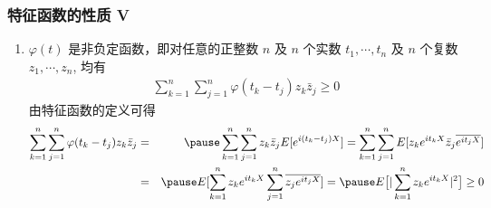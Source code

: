 \documentclass[Prob-All.tex]{subfiles}
\begin{document}
\begin{frame}
	\frametitle{特征函数的性质 V}

	\begin{enumerate}
		\item[9.] $\varphi (t)$ 是非负定函数，即对任意的正整数 $n$ 及 $n$ 个实数 $t_1,\cdots, t_n$ 及 $n$ 个复数 $z_1,\cdots, z_n$, 均有
		\begin{eqnarray*}
			\sum_{k=1}^n\sum_{j=1}^n\varphi(t_k-t_j)z_k\bar{z}_j\ge 0
		\end{eqnarray*}
		\zheng 由特征函数的定义可得
		{\small\begin{eqnarray*}
				\sum_{k=1}^n\sum_{j=1}^n\varphi(t_k-t_j)z_k\bar{z}_j&=&\pause \sum_{k=1}^n\sum_{j=1}^nz_k\bar{z}_jE[e^{i(t_k-t_j)X}]=\sum_{k=1}^n\sum_{j=1}^nE[z_ke^{it_kX}\bar{z}_j\overline{e^{it_jX}}]\\
				&=&\pause E[\sum_{k=1}^nz_ke^{it_kX}\sum_{j=1}^n\overline{z_je^{it_jX}}]=\pause E\big[|\sum_{k=1}^nz_ke^{it_kX}|^2\big]\ge 0
		\end{eqnarray*}}

	\end{enumerate}
\end{frame}
\end{document}
